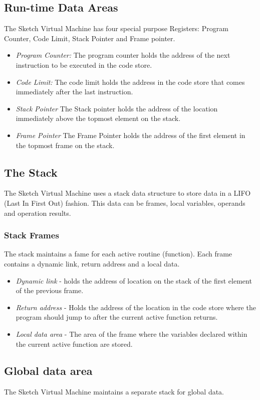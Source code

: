 \documentclass{l3proj}
\begin{document}
\subsection{Run-time Data Areas}
The Sketch Virtual Machine has four special purpose Registers: Program Counter, Code Limit, Stack Pointer and Frame pointer.
\begin{itemize}
	\item\textit{Program Counter:} The program counter holds the address of the next instruction to be executed in the code store.
	\item\textit{Code Limit:} The code limit holds the address in the code store that comes immediately after the last instruction.
	\item\textit{Stack Pointer} The Stack pointer holds the address of the location immediately above the topmost element on the stack.
	\item\textit{Frame Pointer} The Frame Pointer holds the address of the first element in the topmost frame on the stack.
\end{itemize}

\subsection{The Stack}
The Sketch Virtual Machine uses a stack data structure to store data in a LIFO (Last In First Out) fashion. This data can be frames, local variables, operands and operation results.

\subsubsection{Stack Frames}
The stack maintains a fame for each active routine (function). Each frame contains a dynamic link, return address and a local data.
\begin{itemize}
	\item\textit{Dynamic link} - holds the address of location on the stack of the first element of the previous frame. 
	\item\textit{Return address} - Holds the address of the location in the code store where the program should jump to after the current active function returns.
	\item\textit{Local data area} - The area of the frame where the variables declared within the current active function are stored.
\end{itemize}

\subsection{Global data area}
The Sketch Virtual Machine maintains a separate stack for global data.
\end{document}
